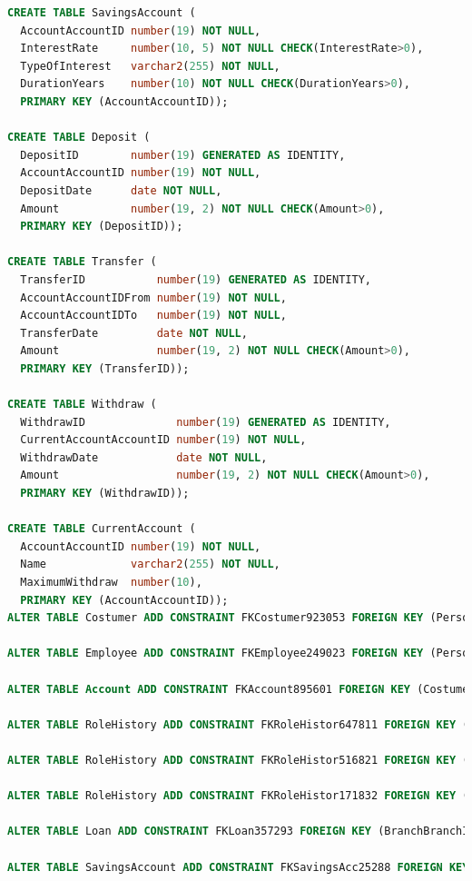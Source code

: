 \documentclass[a4paper, 10pt]{article}
\begin{document}
\begin{lstlisting}[language=SQL]
CREATE TABLE SavingsAccount (
  AccountAccountID number(19) NOT NULL, 
  InterestRate     number(10, 5) NOT NULL CHECK(InterestRate>0), 
  TypeOfInterest   varchar2(255) NOT NULL, 
  DurationYears    number(10) NOT NULL CHECK(DurationYears>0), 
  PRIMARY KEY (AccountAccountID));

CREATE TABLE Deposit (
  DepositID        number(19) GENERATED AS IDENTITY, 
  AccountAccountID number(19) NOT NULL, 
  DepositDate      date NOT NULL, 
  Amount           number(19, 2) NOT NULL CHECK(Amount>0), 
  PRIMARY KEY (DepositID));

CREATE TABLE Transfer (
  TransferID           number(19) GENERATED AS IDENTITY, 
  AccountAccountIDFrom number(19) NOT NULL, 
  AccountAccountIDTo   number(19) NOT NULL, 
  TransferDate         date NOT NULL, 
  Amount               number(19, 2) NOT NULL CHECK(Amount>0), 
  PRIMARY KEY (TransferID));

CREATE TABLE Withdraw (
  WithdrawID              number(19) GENERATED AS IDENTITY, 
  CurrentAccountAccountID number(19) NOT NULL, 
  WithdrawDate            date NOT NULL, 
  Amount                  number(19, 2) NOT NULL CHECK(Amount>0), 
  PRIMARY KEY (WithdrawID));

CREATE TABLE CurrentAccount (
  AccountAccountID number(19) NOT NULL, 
  Name             varchar2(255) NOT NULL, 
  MaximumWithdraw  number(10), 
  PRIMARY KEY (AccountAccountID));
ALTER TABLE Costumer ADD CONSTRAINT FKCostumer923053 FOREIGN KEY (PersonGovID) REFERENCES Person (GovID);

ALTER TABLE Employee ADD CONSTRAINT FKEmployee249023 FOREIGN KEY (PersonGovID) REFERENCES Person (GovID);

ALTER TABLE Account ADD CONSTRAINT FKAccount895601 FOREIGN KEY (CostumerCostumerID) REFERENCES Costumer (CostumerID);

ALTER TABLE RoleHistory ADD CONSTRAINT FKRoleHistor647811 FOREIGN KEY (RoleRoleID) REFERENCES Role (RoleID);

ALTER TABLE RoleHistory ADD CONSTRAINT FKRoleHistor516821 FOREIGN KEY (EmployeeEmployeeID) REFERENCES Employee (EmployeeID);

ALTER TABLE RoleHistory ADD CONSTRAINT FKRoleHistor171832 FOREIGN KEY (BranchBranchId) REFERENCES Branch (BranchId);

ALTER TABLE Loan ADD CONSTRAINT FKLoan357293 FOREIGN KEY (BranchBranchId) REFERENCES Branch (BranchId);

ALTER TABLE SavingsAccount ADD CONSTRAINT FKSavingsAcc25288 FOREIGN KEY (AccountAccountID) REFERENCES Account (AccountID);


\end{lstlisting}
\end{document}
